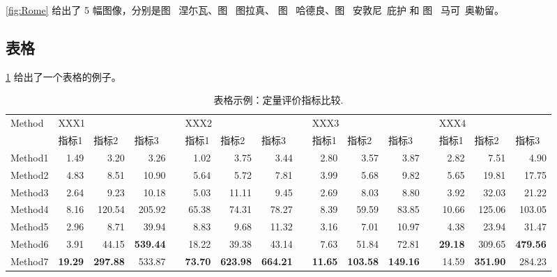 \documentclass[a4paper,cs4size]{article}
\begin{document}
\cref{fig:Rome} 给出了 5 幅图像，分别是图~ 涅尓瓦、图~ 图拉真、
图~ 哈德良、图~ 安敦尼\ 庇护 和 图~ 马可\ 奥勒留。

\subsection{表格}

\cref{tab:Quantitative} 给出了一个表格的例子。

\begin{table}[htb!]
  \centering
  \setlength{\tabcolsep}{2pt}
  \scriptsize
  \caption{表格示例：定量评价指标比较.}
    \begin{tabular}{lrrrrrrrrrrrrrrr}
    \toprule
    Method & \multicolumn{3}{l}{XXX1} & & \multicolumn{3}{l}{XXX2} & & \multicolumn{3}{l}{XXX3} & & \multicolumn{3}{l}{XXX4} \\ 
    \cmidrule{2-4} \cmidrule{6-8} \cmidrule{10-12} \cmidrule{14-16}
           & \multicolumn{1}{l}{指标1} & \multicolumn{1}{l}{指标2} & \multicolumn{1}{l}{指标3} & & \multicolumn{1}{l}{指标1} & \multicolumn{1}{l}{指标2} & \multicolumn{1}{l}{指标3} & & \multicolumn{1}{l}{指标1} & \multicolumn{1}{l}{指标2} & \multicolumn{1}{l}{指标3} & & \multicolumn{1}{l}{指标1} & \multicolumn{1}{l}{指标2} & \multicolumn{1}{l}{指标3} \\
    \midrule          
    Method1 & 1.49  & 3.20  & 3.26  &       & 1.02  & 3.75  & 3.44  &       & 2.80  & 3.57  & 3.87  &       & 2.82  & 7.51  & 4.90 \\
    Method2 & 4.83  & 8.51  & 10.90 &       & 5.64  & 5.72  & 7.81  &       & 3.99  & 5.68  & 9.82  &       & 5.65  & 19.81 & 17.75 \\
    Method3 & 2.64  & 9.23  & 10.18 &       & 5.03  & 11.11 & 9.45  &       & 2.69  & 8.03  & 8.80  &       & 3.92  & 32.03 & 21.22 \\
    Method4   & 8.16  & 120.54 & 205.92 &       & 65.38 & 74.31 & 78.27 &       & 8.39  & 59.59 & 83.85 &       & 10.66 & 125.06 & 103.05 \\
    Method5 & 2.96  & 8.71  & 39.94 &       & 8.83  & 9.68  & 11.32 &       & 3.16  & 7.01  & 10.97 &       & 4.38  & 23.94 & 31.47 \\
    Method6  & 3.91  & 44.15 & \textbf{539.44} & \textbf{} & 18.22 & 39.38 & 43.14 &       & 7.63  & 51.84 & 72.81 &       & \textbf{29.18} & 309.65 & \textbf{479.56} \\
    Method7 & \textbf{19.29} & \textbf{297.88} & 533.87 &       & \textbf{73.70} & \textbf{623.98} & \textbf{664.21} & \textbf{} & \textbf{11.65} & \textbf{103.58} & \textbf{149.16} & \textbf{} & 14.59 & \textbf{351.90} & 284.23 \\
    \bottomrule
    \end{tabular}%
  \label{tab:Quantitative}%
\end{table}%
\end{document}
